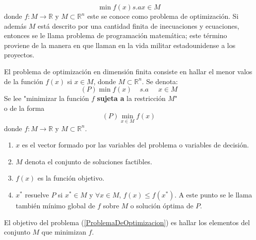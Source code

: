 \documentclass[10pt,twoside]{SelfArx} %
\begin{document}
  \begin{equation}
  \min f(x) s.a x\in M
  \end{equation}
  donde $ f:M\rightarrow\mathbb{R} $ y $ M\subset\mathbb{R}^{n} $ este se conoce como problema de optimización. Si además $ M $ está descrito por una cantidad finita de inecuaciones y ecuaciones,
  entonces se le llama problema de programación matemática; este término proviene de la manera en que llaman en la vida militar estadounidense a los
  proyectos.
  \begin{thm}
  	El problema de optimización en dimensión finita consiste en hallar el menor valos de la función $ f(x) $ si $ x\in M $, donde $ M\subset\mathbb{R}^{n} $. Se denota:
  	\begin{equation}
  	(P) \min f(x) \;\;\;\; s.a\;\;\;\;\; x\in M\label{ProblemaDeOptimizacion}
  	\end{equation}
  	Se lee "minimizar la funci\'on $ f $ \textbf{sujeta a} la restricci\'on $ M $"\\
  	o de la forma
  	\begin{equation}
  	(P) \min_{x\in M} f(x)
  	\end{equation}
  	 donde $ f:M\rightarrow\mathbb{R} $ y $ M\subset\mathbb{R}^{n} $.
  \end{thm}
  \begin{enumerate}
	\item   	$ x $ es el vector formado por las variables del problema o variables de decisión.
  	\item   	$ M $ denota el conjunto de soluciones factibles.

	\item   	$ f(x) $ es la función objetivo.
  	\item $ x^{*} $ resuelve $ P $ si $ x^{*}\in M $ y $ \forall x\in M $, $ f(x)\leq f(x^{*}) $. A este punto se le llama también \textsf{mínimo global de $ f $ sobre $ M $} o \textsf{solución óptima de $ P $}.
  \end{enumerate}
  El objetivo del problema (\ref{ProblemaDeOptimizacion}) es hallar los elementos del conjunto $ M $ que minimizan $ f $.
\end{document}

